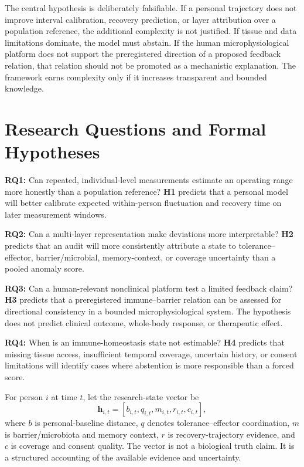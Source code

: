 \documentclass[conference]{IEEEtran}
\begin{document}
The central hypothesis is deliberately falsifiable. If a personal trajectory does not improve interval calibration, recovery prediction, or layer attribution over a population reference, the additional complexity is not justified. If tissue and data limitations dominate, the model must abstain. If the human microphysiological platform does not support the preregistered direction of a proposed feedback relation, that relation should not be promoted as a mechanistic explanation. The framework earns complexity only if it increases transparent and bounded knowledge.

\section{Research Questions and Formal Hypotheses}

\textbf{RQ1:} Can repeated, individual-level measurements estimate an operating range more honestly than a population reference? \textbf{H1} predicts that a personal model will better calibrate expected within-person fluctuation and recovery time on later measurement windows.

\textbf{RQ2:} Can a multi-layer representation make deviations more interpretable? \textbf{H2} predicts that an audit will more consistently attribute a state to tolerance--effector, barrier/microbial, memory-context, or coverage uncertainty than a pooled anomaly score.

\textbf{RQ3:} Can a human-relevant nonclinical platform test a limited feedback claim? \textbf{H3} predicts that a preregistered immune--barrier relation can be assessed for directional consistency in a bounded microphysiological system. The hypothesis does not predict clinical outcome, whole-body response, or therapeutic effect.

\textbf{RQ4:} When is an immune-homeostasis state not estimable? \textbf{H4} predicts that missing tissue access, insufficient temporal coverage, uncertain history, or consent limitations will identify cases where abstention is more responsible than a forced score.

For person $i$ at time $t$, let the research-state vector be
\begin{equation}
\mathbf{h}_{i,t}=\left[b_{i,t},q_{i,t},m_{i,t},r_{i,t},c_{i,t}\right],
\label{eq:state}
\end{equation}
where $b$ is personal-baseline distance, $q$ denotes tolerance--effector coordination, $m$ is barrier/microbiota and memory context, $r$ is recovery-trajectory evidence, and $c$ is coverage and consent quality. The vector is not a biological truth claim. It is a structured accounting of the available evidence and uncertainty.
\end{document}
